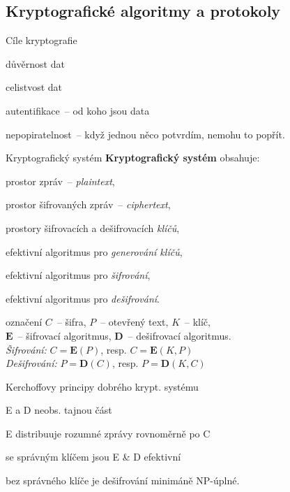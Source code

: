 \subsection{Kryptografické algoritmy a protokoly}

\begin{obecne}{Cíle kryptografie}
  \begin{pitemize}
    \item důvěrnost dat
    \item celistvost dat
    \item autentifikace~-- od koho jsou data
    \item nepopiratelnost~-- když jednou něco potvrdím, nemohu to popřít.
  \end{pitemize}
\end{obecne}

\begin{definiceN}{Kryptografický systém}
 \textbf{ Kryptografický systém} obsahuje:
  \begin{pitemize}
    \item prostor zpráv~-- \emph{plaintext},
    \item prostor šifrovaných zpráv~-- \emph{ciphertext},
    \item prostory šifrovacích a dešifrovacích \emph{klíčů},
    \item efektivní algoritmus pro \emph{generování klíčů},
    \item efektivní algoritmus pro \emph{šifrování},
    \item efektivní algoritmus pro \emph{dešifrování}.
  \end{pitemize}
\end{definiceN}

\begin{definiceN}{označení}
  $C$~-- šifra, $P$~-- otevřený text, $K$~-- klíč,\\
  $\mathbf{E}$~-- šifrovací algoritmus, $\mathbf{D}$~-- dešifrovací algoritmus.\\[3mm]
  \emph{Šifrování:} $C = \mathbf{E}(P)$, resp. $C = \mathbf{E}(K, P)$\\
  \emph{Dešifrování:} $P = \mathbf{D}(C)$, resp. $P = \mathbf{D}(K, C)$\\
\end{definiceN}


\begin{obecne}{Kerchoffovy principy dobrého krypt. systému}
\begin{pitemize}
    \item E a D neobs. tajnou část
    \item E distribuuje rozumné zprávy rovnoměrně po C
    \item se správným klíčem jsou E \& D efektivní
    \item bez správného klíče je dešifrování minimáně NP-úplné. 
\end{pitemize}
\end{obecne}

